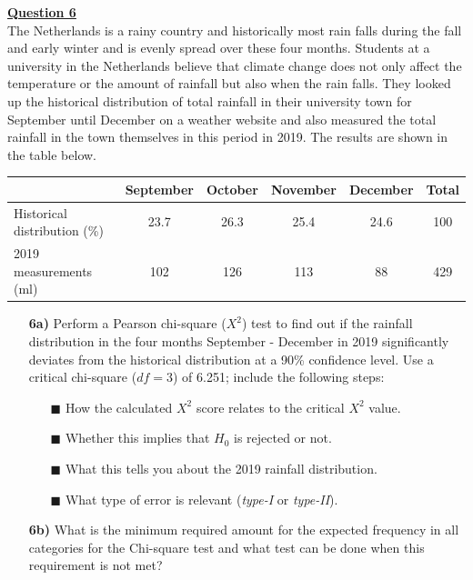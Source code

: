 \underline{\textbf{Question 6}} \\

The Netherlands is a rainy country and historically most rain falls during the fall and early winter and is evenly spread over these four months. Students at a university in the Netherlands believe that climate change does not only affect the temperature or the amount of rainfall but also when the rain falls. They looked up the historical distribution of total rainfall in their university town for September until December on a weather website and also measured the total rainfall in the town themselves in this period in 2019. The results are shown in the table below. \\

\begin{center}
\begin{tabular}{l|c|c|c|c|c}
     & September & October & November & December & Total \\
     \hline
     Historical distribution (\%) & 23.7 & 26.3 & 25.4 & 24.6 & 100 \\
     2019 measurements (ml) & 102 & 126 & 113 & 88 & 429
\end{tabular}
\end{center} 

\begin{itemize}

    \item[\textbf{6a)}] Perform a Pearson chi-square ($X^2$) test to find out if the rainfall distribution in the four months September - December in 2019 significantly deviates from the historical distribution at a 90\% confidence level. Use a critical chi-square ($df = 3$) of 6.251; include the following steps:
    \begin{enumerate}
        \item[$\blacksquare$] How the calculated $X^2$ score relates to the critical $X^2$ value.
        \item[$\blacksquare$] Whether this implies that $H_0$ is rejected or not.
        \item[$\blacksquare$] What this tells you about the 2019 rainfall distribution.
        \item[$\blacksquare$] What type of error is relevant (\textit{type-I} or \textit{type-II}).
    \end{enumerate}
    
    \item[\textbf{6b)}] What is the minimum required amount for the expected frequency in all categories for the Chi-square test and what test can be done when this requirement is not met?

\end{itemize}

